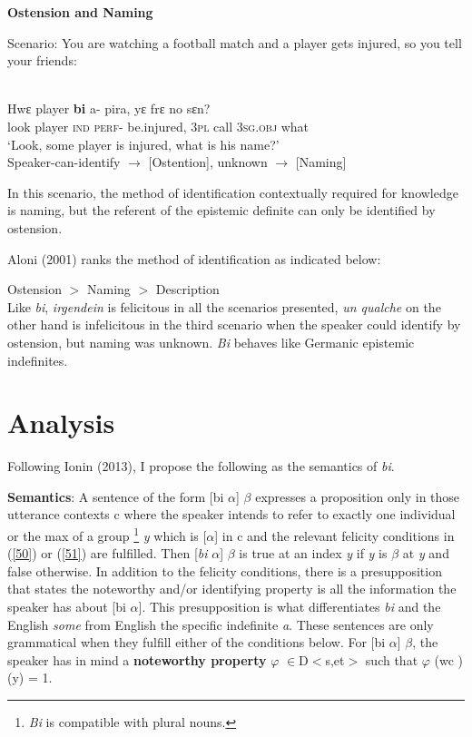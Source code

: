 \documentclass[output=paper,modfonts]{langsci/langscibook}
\begin{document}
\textbf{Ostension and Naming}

 Scenario: You are watching a football match and a player gets injured, so you tell your friends:

 \ea\label{ex45}\\
\gll Hwε player \textbf{bi} a- pira, yε frε no sεn?\\
look player  \textsc{ind} \textsc{perf}- be.injured, \textsc{3pl} call \textsc{3sg}.\textsc{obj} what\\
\glt `Look, some player is injured, what is his name?'\\
	Speaker-can-identify $\rightarrow$ [Ostention], unknown $\rightarrow$  [Naming]

 \z In this scenario, the method of identification contextually required for knowledge is naming, but the referent of the epistemic definite can only be identified by ostension.
 
 Aloni (2001) ranks the method of identification as indicated below:
 
 Ostension $>$ Naming $>$ Description\\
 
Like \emph{bi}, \emph{irgendein} is felicitous in all the scenarios presented, \emph{un qualche} on the other hand is infelicitous in the third scenario when the speaker could identify by ostension, but naming was unknown. \emph{Bi} behaves like Germanic epistemic indefinites.

\section{Analysis}
Following Ionin (2013), I propose the following as the semantics of \emph{bi}.

\textbf{Semantics}: A sentence of the form [bi $\alpha$] $\beta$ expresses a proposition only in those utterance contexts c where the speaker intends to refer to exactly one individual or the max of a group \footnote{\emph{Bi} is compatible with plural nouns.} \emph{y} which is [$\alpha$] in c and the relevant felicity conditions in (\ref{50}) or (\ref{51}) are fulfilled. Then [\emph{bi} $\alpha$] $\beta$ is true at an index \emph{y} if \emph{y} is $\beta$ at \emph{y} and false otherwise. In addition to the felicity conditions, there is a presupposition that states the noteworthy and/or identifying property is all the information the speaker has about [bi $\alpha$]. This presupposition is what differentiates \emph{bi} and the English \emph{some} from English the specific indefinite \emph{a}.   
These sentences are only grammatical when they fulfill either of the conditions below. 
\ea
\ea \label{50} For [bi $\alpha$] $\beta$, the speaker has in mind a \textbf{noteworthy property} $\varphi$ $\in$D$<$s,et$>$ such that $\varphi$ (wc )(y) = 1.
\end{document}
